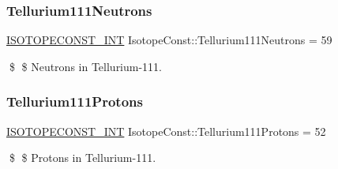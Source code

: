 \subsubsection{\texorpdfstring{Tellurium111\+Neutrons}{Tellurium111Neutrons}}
{\footnotesize\ttfamily \mbox{\hyperlink{group___isotope_const-_macros_ga5f18360b3e99483a35c32d789e62621c}{I\+S\+O\+T\+O\+P\+E\+C\+O\+N\+S\+T\+\_\+\+I\+NT}} Isotope\+Const\+::\+Tellurium111\+Neutrons = 59}

\$ \$ Neutrons in Tellurium-\/111. \mbox{\label{group___isotope_const-_tellurium-_te111_gaa931d88d18c8094c55cda85417264e0f}} 
\subsubsection{\texorpdfstring{Tellurium111\+Protons}{Tellurium111Protons}}
{\footnotesize\ttfamily \mbox{\hyperlink{group___isotope_const-_macros_ga5f18360b3e99483a35c32d789e62621c}{I\+S\+O\+T\+O\+P\+E\+C\+O\+N\+S\+T\+\_\+\+I\+NT}} Isotope\+Const\+::\+Tellurium111\+Protons = 52}

\$ \$ Protons in Tellurium-\/111. 